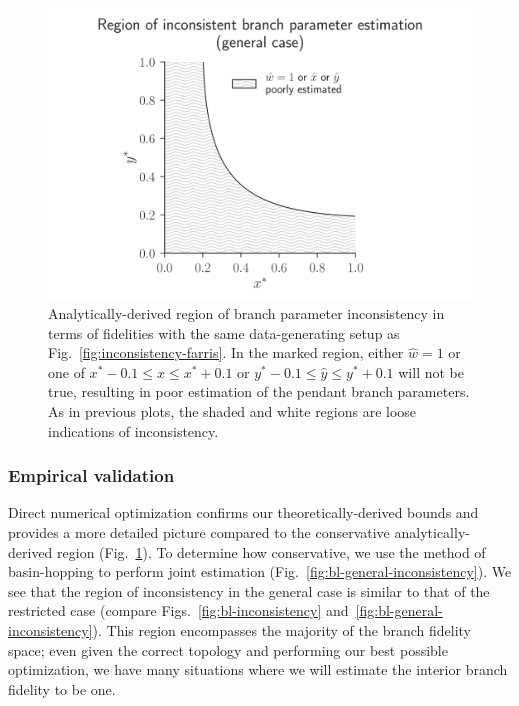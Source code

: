 \documentclass{article}
\begin{document}
\begin{figure}
\centering
\includegraphics[width=\textwidth]{bl-loose-inconsistency-inkscape}
\caption{
    Analytically-derived region of branch parameter inconsistency in terms of fidelities with the same data-generating setup as Fig.~\ref{fig:inconsistency-farris}.
    In the marked region, either $\hat{w}=1$ or one of $x^*-0.1 \le \hat{x} \le x^*+0.1$ or $y^*-0.1 \le \hat{y} \le y^*+0.1$ will not be true, resulting in poor estimation of the pendant branch parameters.
    As in previous plots, the shaded and white regions are loose indications of inconsistency.
}
\label{fig:bl-loose-inconsistency}
\end{figure}

\subsubsection*{Empirical validation}

Direct numerical optimization confirms our theoretically-derived bounds and provides a more detailed picture compared to the conservative analytically-derived region (Fig.~\ref{fig:bl-loose-inconsistency}).
To determine how conservative, we use the method of basin-hopping \cite{Wales1997} to perform joint estimation (Fig.~\ref{fig:bl-general-inconsistency}).
We see that the region of inconsistency in the general case is similar to that of the restricted case (compare Figs.~\ref{fig:bl-inconsistency} and~\ref{fig:bl-general-inconsistency}).
This region encompasses the majority of the branch fidelity space; even given the correct topology and performing our best possible optimization, we have many situations where we will estimate the interior branch fidelity to be one.
\end{document}
